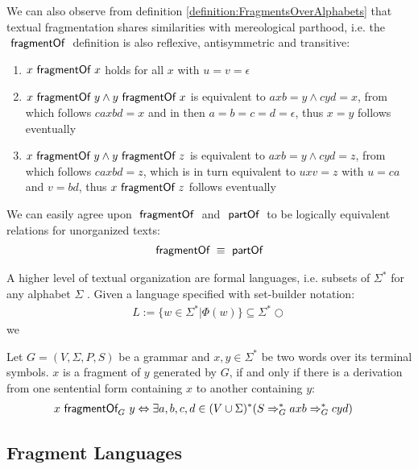 We can also observe from definition \ref{definition:FragmentsOverAlphabets} that textual fragmentation shares similarities with mereological parthood, i.e. the $~\textsf{fragmentOf}~$ definition is also reflexive, antisymmetric and transitive:
\begin{enumerate}
\item
$x ~\textsf{fragmentOf}~ x$ holds for all $x$ with $u = v = \epsilon$
\item
$x ~\textsf{fragmentOf}~ y \wedge y ~\textsf{fragmentOf}~ x$ is equivalent to $axb = y \wedge cyd = x$, from which follows $caxbd = x$ and in then $a=b=c=d=\epsilon$, thus $x = y$ follows eventually
\item
$x ~\textsf{fragmentOf}~ y \wedge y ~\textsf{fragmentOf}~ z$ is equivalent to $axb = y \wedge cyd = z$, from which follows $caxbd = z$, which is in turn equivalent to $uxv = z$ with $u = ca$ and $v = bd$, thus $x ~\textsf{fragmentOf}~ z$ follows eventually
\end{enumerate}
We can easily agree upon $~\textsf{fragmentOf}~$ and $~\textsf{partOf}~$ to be logically equivalent relations for unorganized texts:
\begin{align}
~\textsf{fragmentOf}~ \equiv ~\textsf{partOf}~
\end{align}

A higher level of textual organization are formal languages, i.e. subsets of $\Sigma^\ast$ for any alphabet $\Sigma$ \cite{DBLP:books/daglib/0090590}.
Given a language specified with set-builder notation:
\begin{align}
L := \{ w \in \Sigma^\ast | \Phi(w) \} \subseteq \Sigma^\ast \bigcirc
\end{align}
we 


\begin{definition}
Let $G = (V,\Sigma,P,S)$ be a grammar and $x,y \in \Sigma^\ast$ be two words over its terminal symbols. $x$ is a fragment of $y$ generated by $G$, if and only if there is a derivation from one sentential form containing $x$ to another containing $y$:
\begin{align}
&x ~\textsf{fragmentOf}_{G}~ y 
\Leftrightarrow
\exists a,b,c,d \in (V \cup \Sigma)^\ast 
(S \Rightarrow_G^\ast axb \Rightarrow_G^\ast cyd)
\end{align}
\end{definition}

\subsection{Fragment Languages}


